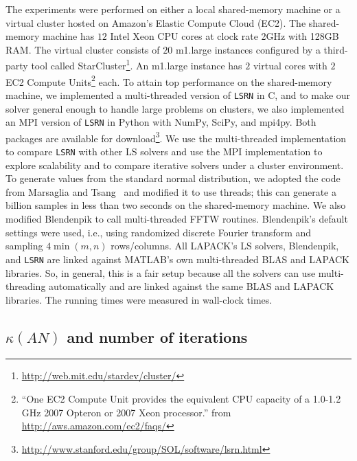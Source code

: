 \documentclass{siamltex}
\begin{document}
The experiments were performed on either a local shared-memory machine or a
virtual cluster hosted on Amazon's Elastic Compute Cloud (EC2). The
shared-memory machine has $12$ Intel Xeon CPU cores at clock rate 2GHz with
128GB RAM. The virtual cluster consists of $20$ m1.large instances configured by
a third-party tool called
StarCluster\footnote{\url{http://web.mit.edu/stardev/cluster/}}. An m1.large
instance has $2$ virtual cores with $2$ EC2 Compute Units\footnote{``One EC2
  Compute Unit provides the equivalent CPU capacity of a 1.0-1.2 GHz 2007
  Opteron or 2007 Xeon processor.'' from \url{http://aws.amazon.com/ec2/faqs/}}
each. To attain top performance on the shared-memory machine, we implemented a
multi-threaded version of \texttt{LSRN} in C, and to make our solver general
enough to handle large problems on clusters, we also implemented an MPI version
of \texttt{LSRN} in Python with NumPy, SciPy, and mpi4py. Both packages are
available for
download\footnote{\url{http://www.stanford.edu/group/SOL/software/lsrn.html}}. We
use the multi-threaded implementation to compare \texttt{LSRN} with other LS
solvers and use the MPI implementation to explore scalability and to compare
iterative solvers under a cluster environment. To generate values from the
standard normal distribution, we adopted the code from Marsaglia and
Tsang~\cite{marsaglia2000ziggurat} and modified it to use threads; this can
generate a billion samples in less than two seconds on the shared-memory
machine.  We also modified Blendenpik to call multi-threaded FFTW
routines. Blendenpik's default settings were used, i.e., using randomized
discrete Fourier transform and sampling $4 \min(m,n)$ rows/columns. All LAPACK's
LS solvers, Blendenpik, and \texttt{LSRN} are linked against MATLAB's own
multi-threaded BLAS and LAPACK libraries. So, in general, this is a fair setup
because all the solvers can use multi-threading automatically and are linked
against the same BLAS and LAPACK libraries.  The running times were
measured in wall-clock times.

\subsection{$\kappa(AN)$ and number of iterations}
\label{sec:condition-number} 
\end{document}
